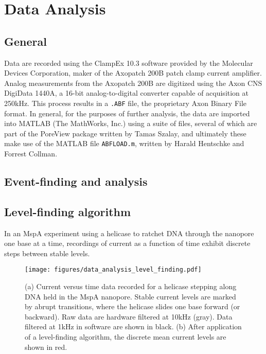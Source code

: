 \chapter{Data Analysis}
\label{data_analysis}

\section{General}

Data are recorded using the ClampEx 10.3 software provided by the Molecular Devices Corporation, maker of the Axopatch 200B patch clamp current amplifier.  Analog measurements from the Axopatch 200B are digitized using the Axon CNS DigiData 1440A, a 16-bit analog-to-digital converter capable of acquisition at 250kHz.  This process results in a \texttt{.ABF} file, the proprietary Axon Binary File format.  In general, for the purposes of further analysis, the data are imported into MATLAB (The MathWorks, Inc.) using a suite of files, several of which are part of the PoreView package written by Tamas Szalay, and ultimately these make use of the MATLAB file \texttt{ABFLOAD.m}, written by Harald Hentschke and Forrest Collman.

\section{Event-finding and analysis}

\section{Level-finding algorithm}
\label{level_finding}

In an MspA experiment using a helicase to ratchet DNA through the nanopore one base at a time, recordings of current as a function of time exhibit discrete steps between stable levels.

\begin{figure}[h]
\begin{centering}
\texttt{[image: figures/data\_analysis\_level\_finding.pdf]}
\caption[Data analysis: level-finding]{(a) Current versus time data recorded for a helicase stepping along DNA held in the MspA nanopore.  Stable current levels are marked by abrupt transitions, where the helicase slides one base forward (or backward).  Raw data are hardware filtered at 10kHz (gray).  Data filtered at 1kHz in software are shown in black.  (b) After application of a level-finding algorithm, the discrete mean current levels are shown in red.}
\label{fig:data_analysis_levels}
\end{centering}
\end{figure}

